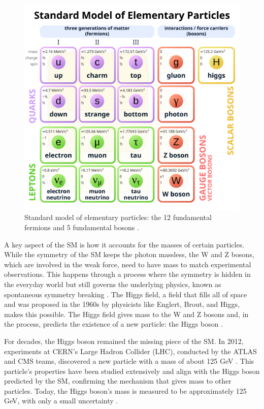 \begin{figure}[h]
    \centering
    \includegraphics[width=0.75\linewidth]{media/1024px-Standard_Model_of_Elementary_Particles.svg.png}
    \caption{Standard model of elementary particles: the 12 fundamental fermions and 5 fundamental bosons \cite{cush:standard-model}.}
    \label{fig:standard_model}
\end{figure}

A key aspect of the SM is how it accounts for the masses of certain particles. While the symmetry of the SM keeps the photon massless, the W and Z bosons, which are involved in the weak force, need to have mass to match experimental observations. This happens through a process where the symmetry is hidden in the everyday world but still governs the underlying physics, known as spontaneous symmetry breaking \cite{pich2012standardmodelelectroweakinteractions}. The Higgs field, a field that fills all of space and was proposed in the 1960s by physicists like Englert, Brout, and Higgs, makes this possible. The Higgs field gives mass to the W and Z bosons and, in the process, predicts the existence of a new particle: the Higgs boson \cite{pich2012standardmodelelectroweakinteractions}.

For decades, the Higgs boson remained the missing piece of the SM. In 2012, experiments at CERN’s Large Hadron Collider (LHC), conducted by the ATLAS and CMS teams, discovered a new particle with a mass of about 125 GeV \cite{Chatrchyan_2012}. This particle’s properties have been studied extensively and align with the Higgs boson predicted by the SM, confirming the mechanism that gives mass to other particles. Today, the Higgs boson’s mass is measured to be approximately 125 GeV, with only a small uncertainty \cite{Chatrchyan_2012}.

